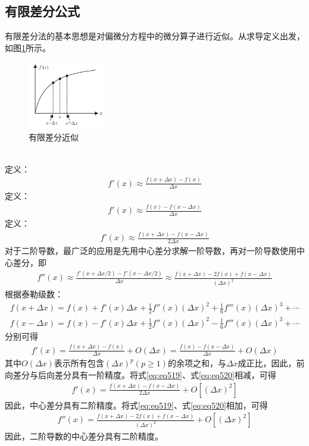 \documentclass{article}
\numberwithin{equation}{section}
\begin{document}
\subsection{有限差分公式}
有限差分法的基本思想是对偏微分方程中的微分算子进行近似。从求导定义出发，如图\ref{fig:fig48}所示。
\begin{figure}[ht]
    \centering
    \includegraphics[width=0.3\textwidth]{有限差分近似.PNG}
    \caption{有限差分近似}
    \label{fig:fig48}
\end{figure}
\\
定义\textbf{\color{blue}{前向差分公式}}：
\begin{align}
    \label{eq:eq515}
    f'(x)\approx\frac{f(x+\Delta x)-f(x)}{\Delta x}
\end{align}
定义\textbf{\color{blue}{后向差分公式}}：
\begin{align}
    \label{eq:eq516}
    f'(x)\approx\frac{f(x)-f(x-\Delta x)}{\Delta x}
\end{align}
定义\textbf{\color{blue}{中心差分公式}}：
\begin{align}
    \label{eq:eq517}
    f'(x)\approx\frac{f(x+\Delta x)-f(x-\Delta x)}{2\Delta x}
\end{align}
对于二阶导数，最广泛的应用是先用中心差分求解一阶导数，再对一阶导数使用中心差分，即
\begin{align}
    \label{eq:eq518}
    f''(x)\approx\frac{f'(x+\Delta x/2)-f'(x-\Delta x/2)}{\Delta x}\approx\frac{f(x+\Delta x)-2f(x)+f(x-\Delta x)}{(\Delta x)^2}
\end{align}
根据泰勒级数：
\begin{align}
    \label{eq:eq519}
    f(x+\Delta x)=f(x)+f'(x)\Delta x+\frac{1}{2}f''(x)(\Delta x)^2+\frac{1}{6}f'''(x)(\Delta x)^3+\cdots \\
    \label{eq:eq520}
    f(x-\Delta x)=f(x)-f'(x)\Delta x+\frac{1}{2}f''(x)(\Delta x)^2-\frac{1}{6}f'''(x)(\Delta x)^3+\cdots
\end{align}
分别可得
\begin{align}
    \label{eq:eq521}
    f'(x)=\frac{f(x+\Delta x)-f(x)}{\Delta x}+O(\Delta x)=\frac{f(x)-f(x-\Delta x)}{\Delta x}+O(\Delta x)
\end{align}
其中$O(\Delta x)$表示所有包含$(\Delta x)^p(p\geq1)$的余项之和，与$\Delta x$成正比，因此，前向差分与后向差分具有一阶精度。将式\ref{eq:eq519}、式\ref{eq:eq520}相减，可得
\begin{align}
    \label{eq:eq522}
    f'(x)=\frac{f(x+\Delta x)-f(x-\Delta x)}{2\Delta x}+O[(\Delta x)^2]
\end{align}
因此，中心差分具有二阶精度。将式\ref{eq:eq519}、式\ref{eq:eq520}相加，可得
\begin{align}
    \label{eq:eq523}
    f''(x)=\frac{f(x+\Delta x)-2f(x)+f(x-\Delta x)}{(\Delta x)^2}+O[(\Delta x)^2]
\end{align}
因此，二阶导数的中心差分具有二阶精度。
\end{document}
